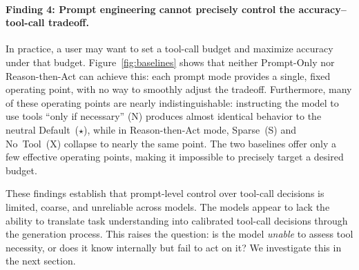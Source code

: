 \paragraph{Finding 4: Prompt engineering cannot precisely control the accuracy--tool-call tradeoff.}
In practice, a user may want to set a tool-call budget and maximize accuracy under that budget. Figure~\ref{fig:baselines} shows that neither Prompt-Only nor Reason-then-Act can achieve this: each prompt mode provides a single, fixed operating point, with no way to smoothly adjust the tradeoff. Furthermore, many of these operating points are nearly indistinguishable: instructing the model to use tools ``only if necessary'' (N) produces almost identical behavior to the neutral Default~($\star$), while in Reason-then-Act mode, Sparse~(S) and No~Tool~(X) collapse to nearly the same point. The two baselines offer only a few effective operating points, making it impossible to precisely target a desired budget.


These findings establish that prompt-level control over tool-call decisions is limited, coarse, and unreliable across models. The models appear to lack the ability to translate task understanding into calibrated tool-call decisions through the generation process. This raises the question: is the model \emph{unable} to assess tool necessity, or does it know internally but fail to act on it? We investigate this in the next section.

